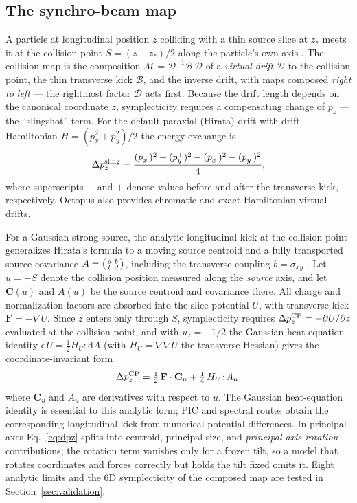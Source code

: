 \documentclass[a4paper,fleqn]{cas-sc}
\begin{document}
\subsection{The synchro-beam map}
\label{sec:sbm}

A particle at longitudinal position $z$ colliding with a thin source slice at
$z_*$ meets it at the collision point $S=(z-z_*)/2$ along the particle's own
axis \citep{HirataMoshammerRuggiero1993}.  The collision map is the
composition $\mathcal M=\mathcal D^{-1}\mathcal B\,\mathcal D$ of a
\emph{virtual drift} $\mathcal D$ to the collision point, the thin transverse
kick $\mathcal B$, and the inverse drift, with maps composed
\emph{right to left} --- the rightmost factor $\mathcal D$ acts first.
Because the drift length depends on
the canonical coordinate $z$, symplecticity requires a compensating change of
$p_z$ --- the ``slingshot'' term.  For the default paraxial (Hirata) drift
with drift Hamiltonian $H=(p_x^2+p_y^2)/2$ the energy exchange is
\begin{equation}
  \Delta p_z^{\rm sling}
  =\frac{(p_x^+)^2+(p_y^+)^2-(p_x^-)^2-(p_y^-)^2}{4},
  \label{eq:sling}
\end{equation}
where superscripts $-$ and $+$ denote values before and after the transverse
kick, respectively.  Octopus also
provides chromatic and exact-Hamiltonian virtual drifts.

For a Gaussian strong source, the analytic longitudinal kick at the collision
point generalizes Hirata's formula to a moving source centroid and a fully
transported source covariance
$A=\begin{psmallmatrix} a & b\\ b & d\end{psmallmatrix}$, including the
transverse coupling $b=\sigma_{xy}$ \citep{LeunissenSchmidtRipken2000}.  Let
$u=-S$ denote the collision position measured along the \emph{source} axis,
and let
$\mathbf C(u)$ and $A(u)$ be the source centroid and covariance there.  All
charge and normalization factors are absorbed into the slice potential $U$,
with transverse kick $\mathbf F=-\nabla U$.  Since $z$ enters only through
$S$, symplecticity requires $\Delta p_z^{\rm CP}=-\partial U/\partial z$
evaluated at the collision point, and with $u_z=-1/2$ the Gaussian
heat-equation identity $\mathrm dU=\tfrac12 H_U\!:\!\mathrm dA$ (with
$H_U=\nabla\nabla U$ the transverse Hessian) gives the coordinate-invariant
form
\begin{equation}
  \Delta p_z^{\rm CP}
  = \tfrac12\,\mathbf F\cdot\mathbf C_u
  + \tfrac14\, H_U\!:\!A_u ,
  \label{eq:dpz}
\end{equation}
where $\mathbf C_u$ and $A_u$ are derivatives with respect to $u$.  The
Gaussian heat-equation identity is essential to this analytic form; PIC and
spectral routes obtain the corresponding longitudinal kick from numerical
potential differences.  In
principal axes Eq.~\eqref{eq:dpz} splits into centroid, principal-size, and
\emph{principal-axis rotation} contributions; the rotation term vanishes
only for a frozen tilt, so a model that rotates coordinates and forces
correctly but holds the tilt fixed omits it.  Eight analytic limits and the 6D symplecticity of the composed
map are tested in Section~\ref{sec:validation}.
\end{document}
